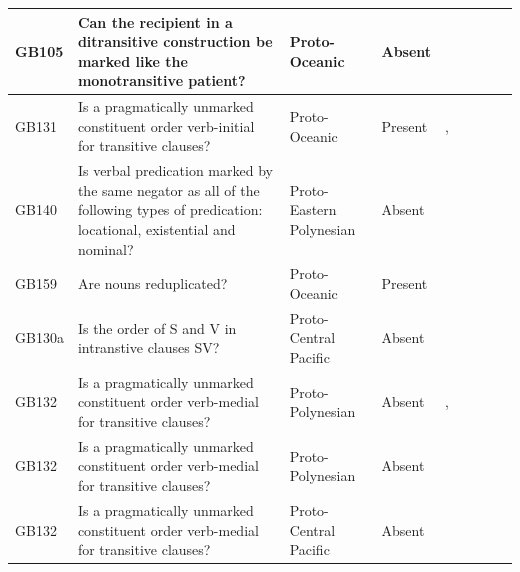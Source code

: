 \documentclass[a4paper,10pt]{article} %
\begin{document}
\begin{landscape}
\begin{longtable}{| p{2cm}| p{3cm}| p{2.5cm}|p{2cm}|p{2cm}|p{2cm}|p{2cm}|p{2cm}|p{2cm}|}
GB105&Can the recipient in a ditransitive construction be marked like the monotransitive patient?&Proto-Oceanic&Absent&\citet[118]{pawley1973some}& \cellcolor{hedvig_lightgreen!50}{True Negative} & \cellcolor{hedvig_yellow!50}{Half} & \cellcolor{hedvig_yellow!50}{Half} & \cellcolor{hedvig_yellow!50}{Half} \\ \hline
GB131&Is a pragmatically unmarked constituent order verb-initial for transitive clauses?&Proto-Oceanic&Present&\citet[118]{pawley1973some}, \citet[86]{lynchrosscrowley_proto_grammar_oceanic}& \cellcolor{hedvig_red!50}{False Negative} & \cellcolor{hedvig_yellow!50}{Half} & \cellcolor{hedvig_yellow!50}{False Negative} & \cellcolor{hedvig_lightgreen!50}{True Positive} \\ \hline
GB140&Is verbal predication marked by the same negator as all of the following types of predication: locational, existential and nominal?&Proto-Eastern Polynesian&Absent&\citet[130]{clark1976aspects}& \cellcolor{hedvig_lightgreen!50}{True Negative} & \cellcolor{hedvig_yellow!50}{Half} & \cellcolor{hedvig_red!50}{False Positive} & \cellcolor{hedvig_yellow!50}{Half} \\ \hline
GB159&Are nouns reduplicated?&Proto-Oceanic&Present&\citet[70]{lynchrosscrowley_proto_grammar_oceanic}& \cellcolor{hedvig_yellow!50}{Half} & \cellcolor{hedvig_yellow!50}{Half} & \cellcolor{hedvig_lightgreen!50}{True Positive} & \cellcolor{hedvig_yellow!50}{Half} \\ \hline
GB130a&Is the order of S and V in intranstive clauses SV?&Proto-Central Pacific&Absent&\citet[122]{kikusawa2002proto}& \cellcolor{hedvig_red!50}{False Positive} & \cellcolor{hedvig_yellow!50}{Half} & \cellcolor{hedvig_red!50}{False Positive} & \cellcolor{hedvig_yellow!50}{True Negative} \\ \hline
GB132&Is a pragmatically unmarked constituent order verb-medial for transitive clauses?&Proto-Polynesian&Absent&\cite[15]{chung1978}, \citet[118]{pawley1973some}& \cellcolor{hedvig_red!50}{False Positive} & \cellcolor{hedvig_yellow!50}{Half} & \cellcolor{hedvig_red!50}{False Positive} & \cellcolor{hedvig_yellow!50}{True Negative} \\ \hline
GB132&Is a pragmatically unmarked constituent order verb-medial for transitive clauses?&Proto-Polynesian&Absent&\citet[122]{kikusawa2002proto}& \cellcolor{hedvig_red!50}{False Positive} & \cellcolor{hedvig_yellow!50}{Half} & \cellcolor{hedvig_red!50}{False Positive} & \cellcolor{hedvig_yellow!50}{True Negative} \\ \hline
GB132&Is a pragmatically unmarked constituent order verb-medial for transitive clauses?&Proto-Central Pacific&Absent&\citet[122]{kikusawa2002proto}& \cellcolor{hedvig_red!50}{False Positive} & \cellcolor{hedvig_red!50}{False Positive} & \cellcolor{hedvig_red!50}{False Positive} & \cellcolor{hedvig_yellow!50}{True Negative} \\ \hline

\end{longtable}
\end{landscape}
\end{document}
